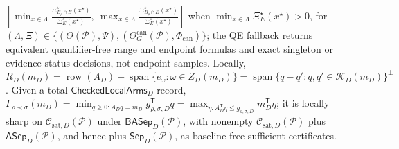\(\left[\min_{x\in\Lambda}\frac{\Xi_{B_\rho\cap E}^\star(x^\star)}{\Xi_E^\star(x^\star)},\ \max_{x\in\Lambda}\frac{\Xi_{B_\rho\cap E}^\star(x^\star)}{\Xi_E^\star(x^\star)}\right]\) when \(\min_{x\in\Lambda}\Xi_E^\star(x^\star)>0\), for \((\Lambda,\Xi)\in\{(\Theta(\mathcal P),\Psi),(\Theta_G^{\mathrm{can}}(\mathcal P),\Phi_{\mathrm{can}})\}\); the QE fallback returns equivalent quantifier-free range and endpoint formulas and exact singleton or evidence-status decisions, not endpoint samples.  Locally, \(R_D(m_D)=\operatorname{row}(A_D)+\operatorname{span}\{e_\omega:\omega\in Z_D(m_D)\}=\operatorname{span}\{q-q':q,q'\in\mathcal K_D(m_D)\}^{\perp}\).  Given a total \(\mathsf{CheckedLocalArms}_D\) record, \(\Gamma_{\rho\prec\sigma}(m_D)=\min_{q\geq0:A_Dq=m_D}g_{\rho,\sigma,D}^{\mathsf T}q=\max_{\eta:A_D^{\mathsf T}\eta\leq g_{\rho,\sigma,D}}m_D^{\mathsf T}\eta\); it is locally sharp on \(\mathcal C_{\mathrm{sat},D}(\mathcal P)\) under \(\mathsf{BASep}_D(\mathcal P)\), with nonempty \(\mathcal C_{\mathrm{sat},D}(\mathcal P)\) plus \(\mathsf{ASep}_D(\mathcal P)\), and hence plus \(\mathsf{Sep}_D(\mathcal P)\), as baseline-free sufficient certificates.